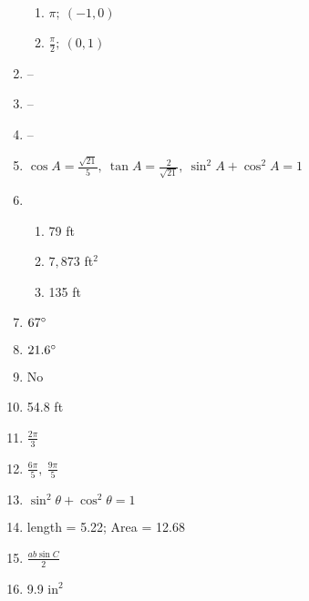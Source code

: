 \documentclass{article}
\begin{document}
\begin{enumerate}
	\begin{enumerate}
	
	\item $\pi ; \ (-1,0)$
	
	\item $\frac{\pi}{2}; \ (0,1)$
	
	\end{enumerate}

\item --

\item -- 

\item --

\item $\cos{A} = \frac{\sqrt{21}}{5}, \ \tan{A} = \frac{2}{\sqrt{21}}, \  \sin^2{A} + \cos^2{A} = 1$

\item

	\begin{enumerate}
	
	\item 79 ft
	
	\item $7,873$ ft$^2$
	
	\item 135 ft
	
	\end{enumerate}
	
\item $67 \degree$

\item $21.6 \degree$

\item No

\item 54.8 ft

\item $\frac{2 \pi}{3}$

\item $\frac{6 \pi}{5}, \ \frac{9 \pi}{5}$

\item $\sin^2{\theta} + \cos^2{\theta} = 1$

\item length = 5.22; Area = 12.68

\item $\frac{ab \sin{C}}{2}$

\item 9.9 in$^2$

\end{enumerate}
\end{document}
